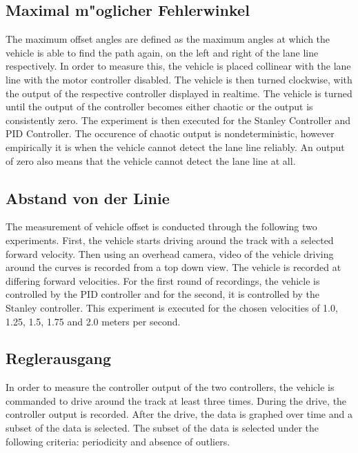 \documentclass[arbeit=studie,oneside,BCOR=12mm]{ArbeitRST}
\begin{document}
\subsection{Maximal m"oglicher Fehlerwinkel}

The maximum offset angles are defined as the maximum angles at which the
vehicle is able to find the path again, on the left and right of the lane line
respectively. In order to measure this, the vehicle is placed collinear with
the lane line with the motor controller disabled. The vehicle is then turned
clockwise, with the output of the respective controller displayed in realtime.
The vehicle is turned until the output of the controller becomes either chaotic
or the output is consistently zero. The experiment is then executed for the
Stanley Controller and PID Controller. The occurence of chaotic output is
nondeterministic, however empirically it is when the vehicle cannot detect the
lane line reliably. An output of zero also means that the vehicle cannot detect
the lane line at all.

\subsection{Abstand von der Linie}

The measurement of vehicle offset is conducted through the following two
experiments. First, the vehicle starts driving around the track with a selected
forward velocity. Then using an overhead camera, video of the vehicle driving
around the curves is recorded from a top down view. The vehicle is recorded at
differing forward velocities. For the first round of recordings, the vehicle is
controlled by the PID controller and for the second, it is controlled by the
Stanley controller. This experiment is executed for the chosen velocities
of 1.0, 1.25, 1.5, 1.75 and 2.0 meters per second.

\subsection{Reglerausgang}

In order to measure the controller output of the two controllers, the vehicle
is commanded to drive around the track at least three times. During the drive,
the controller output is recorded. After the drive, the data is graphed over
time and a subset of the data is selected. The subset of the data is selected
under the following criteria: periodicity and absence of outliers.
\end{document}
